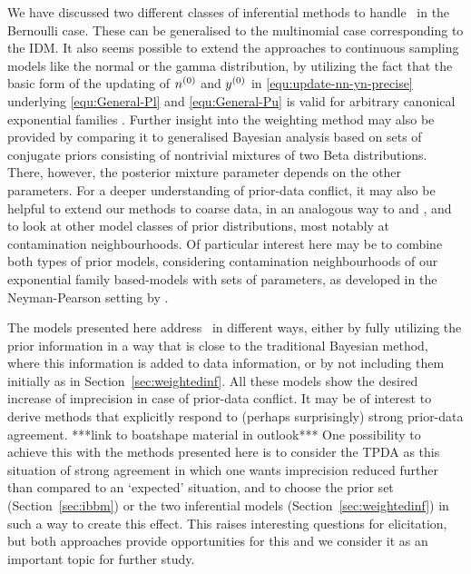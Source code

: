 We have discussed two different classes of inferential
methods to handle \pdc\ in the Bernoulli case. These can be
generalised to the multinomial case corresponding to the IDM.
It also seems possible to extend the approaches to continuous sampling models like the normal
or the gamma distribution, by utilizing the fact that the basic form
of the updating of $n^{(0)}$ and $y^{(0)}$ in
\eqref{equ:update-nn-yn-precise} underlying \eqref{equ:General-Pl}
and \eqref{equ:General-Pu} is valid for arbitrary canonical
exponential families \parencite[see][and Section~\ref{sec:generalmodel}]{2005:quaeghebeurcooman,Walter2009a}.
Further insight into the weighting method may also be provided by
comparing it to generalised Bayesian analysis based on sets of
conjugate priors consisting of nontrivial mixtures of two Beta
distributions. There, however, the posterior mixture parameter depends
on the other parameters.
For a deeper understanding of prior-data conflict, it may also be helpful
to extend our methods to coarse data, in an analogous way to \textcite{2007:utkinaugustin} and
\textcite{2009:Troffaes:Coolen}, and to look at other model classes of prior distributions, most
notably at contamination neighbourhoods. Of particular interest here may
be to combine both types of prior models, considering contamination
neighbourhoods of our exponential family based-models with sets of
parameters, as developed in the Neyman-Pearson setting by
\textcite[\S~5]{2002:augustin}.

The models presented here address \pdc\
in different ways, either by fully utilizing the prior information in a way that is close to the
traditional Bayesian method, where this information is added to data
information, or by not including them initially as in
Section~\ref{sec:weightedinf}. All these models show the desired increase of
imprecision in case of prior-data conflict. It may be of
interest to derive methods that explicitly respond to (perhaps
surprisingly) strong prior-data agreement. ***link to boatshape material in outlook***
One possibility to achieve this with the methods presented here is to
consider the TPDA as this situation of strong agreement in which one wants
imprecision reduced further than compared to an `expected'
situation, and to choose the prior set (Section~\ref{sec:ibbm}) or the two
inferential models (Section~\ref{sec:weightedinf}) in such a way to create this effect.
This raises interesting questions for elicitation, but both approaches
provide opportunities for this and we consider it as an important topic for further
study. %


